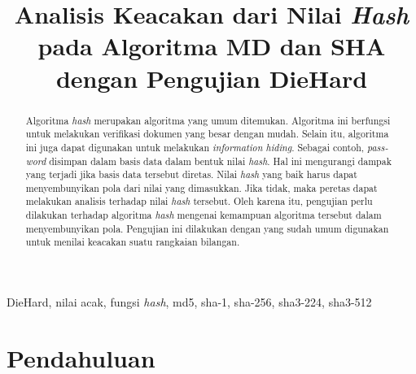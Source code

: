 \documentclass[conference]{IEEEtran}
\newcommand{\en}[1]
    {\foreignlanguage{english}{\textit{#1}}}
\begin{document}
\title{Analisis Keacakan dari Nilai \en{Hash} pada Algoritma MD dan SHA dengan Pengujian DieHard}

\author{
}

\maketitle

\begin{abstract}
    Algoritma \en{hash} merupakan algoritma yang umum ditemukan.
    Algoritma ini berfungsi untuk melakukan verifikasi dokumen yang besar dengan mudah.
    Selain itu, algoritma ini juga dapat digunakan untuk melakukan \en{information hiding}.
    Sebagai contoh, \en{password} disimpan dalam basis data dalam bentuk nilai \en{hash}.
    Hal ini mengurangi dampak yang terjadi jika basis data tersebut diretas.
    Nilai \en{hash} yang baik harus dapat menyembunyikan pola dari nilai yang dimasukkan.
    Jika tidak, maka peretas dapat melakukan analisis terhadap nilai \en{hash} tersebut.
    Oleh karena itu, pengujian perlu dilakukan terhadap algoritma \en{hash} mengenai kemampuan algoritma tersebut dalam menyembunyikan pola.
    Pengujian ini dilakukan dengan  yang sudah umum digunakan untuk menilai keacakan suatu rangkaian bilangan.
\end{abstract}

\begin{IEEEkeywords}
    DieHard, nilai acak, fungsi \en{hash}, md5, sha-1, sha-256, sha3-224, sha3-512
\end{IEEEkeywords}

\section{Pendahuluan}
\end{document}
